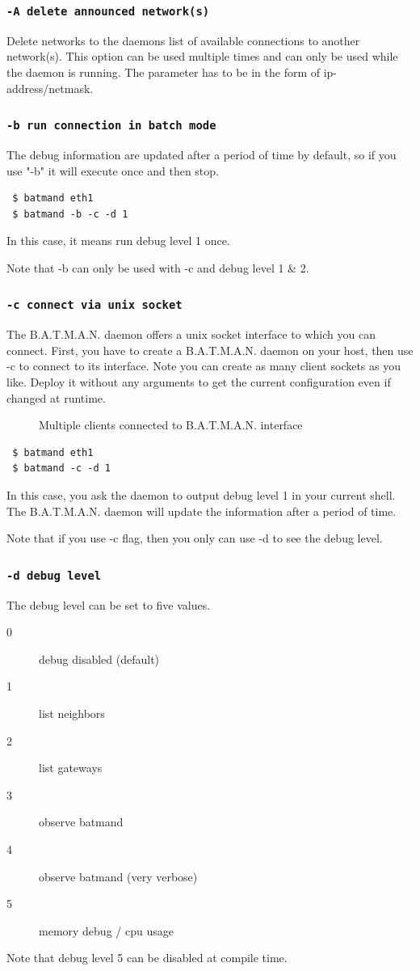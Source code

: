 \documentclass[
	12pt,
	a4paper,
	twoside,
	english,
	headsepline,
	footnosepline,
	automark,
	normalheadings,
	openany,
	cleardoubleplain,
	abstracton,
	idxtotoc,
	liststotoc,
	bibtotoc,
 	BCOR8mm,
]{scrartcl}
\newcommand{\subsubsectionttt}[1]{\subsubsection{\texttt{#1}}}
\begin{document}
\subsubsectionttt{-A delete announced network(s)}
Delete networks to the daemons list of available connections to another
network(s). This option can be used multiple times and can only be used while
the daemon is running. The parameter has to be in the form of
ip-address/netmask.

\subsubsectionttt{-b run connection in batch mode}
The debug information are updated after a period of time by default, so if you
use "-b" it will execute once and then stop.
\begin{verbatim}
 $ batmand eth1
 $ batmand -b -c -d 1
\end{verbatim}
In this case, it means run debug level 1 once.

Note that -b can only be used with -c and debug level 1 \& 2.

\subsubsectionttt{-c connect via unix socket}
The B.A.T.M.A.N. daemon offers a unix socket interface to which you can connect.
First, you have to create a B.A.T.M.A.N. daemon on your host, then use -c to
connect to its interface. Note you can create as many client sockets as you
like.
Deploy it without any arguments to get the current configuration even if changed
at runtime.

\begin{figure}[h]
 \begin{center}
  
 \end{center}
  \caption{Multiple clients connected to B.A.T.M.A.N. interface}
\end{figure}

\begin{verbatim}
 $ batmand eth1
 $ batmand -c -d 1
\end{verbatim}
In this case, you ask the daemon to output debug level 1 in your current shell.
The B.A.T.M.A.N. daemon will update the information after a period of time.

Note that if you use -c flag, then you only can use -d to see the debug level.

\subsubsectionttt{-d debug level}
The debug level can be set to five values.

\begin{description}
 \item[0] debug disabled (default)
 \item[1] list neighbors
 \item[2] list gateways
 \item[3] observe batmand
 \item[4] observe batmand (very verbose)
 \item[5] memory debug / cpu usage
\end{description}
Note that debug level 5 can be disabled at compile time.
\end{document}
